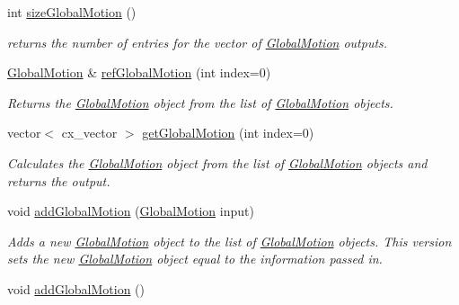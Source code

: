 \begin{DoxyCompactItemize}
int \hyperlink{class_outputs_body_acf20f3cfb2baee6c93a2e17d7e27aa0c}{size\-Global\-Motion} ()
\begin{DoxyCompactList}\small\item\em returns the number of entries for the vector of \hyperlink{class_global_motion}{Global\-Motion} outputs. \end{DoxyCompactList}\item 
\hyperlink{class_global_motion}{Global\-Motion} \& \hyperlink{class_outputs_body_a54325e076109111454b5ed0633c85660}{ref\-Global\-Motion} (int index=0)
\begin{DoxyCompactList}\small\item\em Returns the \hyperlink{class_global_motion}{Global\-Motion} object from the list of \hyperlink{class_global_motion}{Global\-Motion} objects. \end{DoxyCompactList}\item 
vector$<$ cx\-\_\-vector $>$ \hyperlink{class_outputs_body_a7450d306af9db6bb159a1186f017ce6e}{get\-Global\-Motion} (int index=0)
\begin{DoxyCompactList}\small\item\em Calculates the \hyperlink{class_global_motion}{Global\-Motion} object from the list of \hyperlink{class_global_motion}{Global\-Motion} objects and returns the output. \end{DoxyCompactList}\item 
void \hyperlink{class_outputs_body_a29af17e822ec8fe1a397403752d0ff1a}{add\-Global\-Motion} (\hyperlink{class_global_motion}{Global\-Motion} input)
\begin{DoxyCompactList}\small\item\em Adds a new \hyperlink{class_global_motion}{Global\-Motion} object to the list of \hyperlink{class_global_motion}{Global\-Motion} objects. This version sets the new \hyperlink{class_global_motion}{Global\-Motion} object equal to the information passed in. \end{DoxyCompactList}\item 
\hypertarget{class_outputs_body_a889dcf6d9be6e910c110018e0a309eae}{void \hyperlink{class_outputs_body_a889dcf6d9be6e910c110018e0a309eae}{add\-Global\-Motion} ()}\label{class_outputs_body_a889dcf6d9be6e910c110018e0a309eae}


\end{DoxyCompactItemize}
